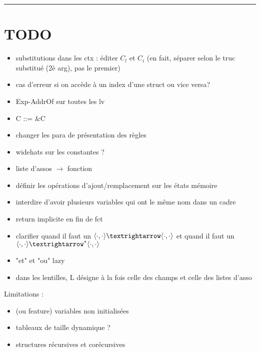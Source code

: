 \begin{center}\rule{3in}{0.4pt}\end{center}

\section*{TODO}

\begin{itemize}
\item substitutions dans les ctx : éditer $C_l$ et $C_i$
  (en fait, séparer selon le truc substitué (2è arg), pas le premier)
\item cas d'erreur si on accède à un index d'une struct ou vice versa?
\item Exp-AddrOf sur toutes les lv
\item C ::= \&C
\item changer les para de présentation des règles
\item widehats sur les constantes ?
\item liste d'assos $→$ fonction
\item définir les opérations d'ajout/remplacement sur les états mémoire
\item interdire d'avoir plusieurs variables qui ont le même nom dans un cadre
\item return implicite en fin de fct
\item clarifier quand il faut un $\mm{\cdot}{\cdot}{\cdot}{\cdot}$
             et quand il faut un $\mmstar{\cdot}{\cdot}{\cdot}{\cdot}$
\item "et" et "ou" lazy
\item dans les lentilles, L désigne à la fois celle des champs et celle des
listes d'asso
\end{itemize}

Limitations :

\begin{itemize}
\item (ou feature) variables non initialisées
\item tableaux de taille dynamique ?
\item structures récursives et corécursives
\end{itemize}

